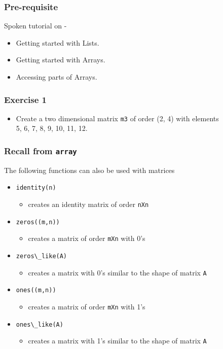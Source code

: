 \documentclass[presentation]{beamer}
\begin{document}
\begin{frame}
\frametitle{Pre-requisite}
\label{sec-3}

  Spoken tutorial on -

\begin{itemize}
\item Getting started with Lists.
\item Getting started with Arrays.
\item Accessing parts of Arrays.
\end{itemize}
\end{frame}
\begin{frame}
\frametitle{Exercise 1}
\label{sec-4}


\begin{itemize}
\item Create a two dimensional matrix \verb~m3~ of order (2, 4) with
   elements \\ 5, 6, 7, 8, 9, 10, 11, 12.
\end{itemize}
\end{frame}
\begin{frame}
\frametitle{Recall from \verb~array~}
\label{sec-5}

  The following functions can also be used with matrices

\begin{itemize}
\item \verb~identity(n)~
\begin{itemize}
\item creates an identity matrix of order \verb~nXn~
\end{itemize}
\item \verb~zeros((m,n))~
\begin{itemize}
\item creates a matrix of order \verb~mXn~ with 0's
\end{itemize}
\item \verb~zeros\_like(A)~
\begin{itemize}
\item creates a matrix with 0's similar to the shape of matrix \verb~A~
\end{itemize}
\item \verb~ones((m,n))~
\begin{itemize}
\item creates a matrix of order \verb~mXn~ with 1's
\end{itemize}
\item \verb~ones\_like(A)~
\begin{itemize}
\item creates a matrix with 1's similar to the shape of matrix \verb~A~
\end{itemize}
\end{itemize}
\end{frame}
\end{document}
